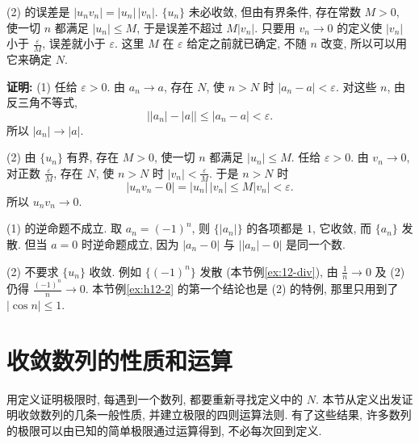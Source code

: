 \documentclass[UTF8,openany]{ctexbook}
\theoremstyle{chinesetextbook}
\newenvironment{cnproof}{\par\indent\textbf{证明:} \ignorespaces}{\par}
\begin{document}
(2) 的误差是 $|u_nv_n|=|u_n|\,|v_n|$. $\{u_n\}$ 未必收敛, 但由有界条件, 存在常数 $M>0$, 使一切 $n$ 都满足 $|u_n|\le M$, 于是误差不超过 $M|v_n|$. 只要用 $v_n\to0$ 的定义使 $|v_n|$ 小于 $\displaystyle\frac\varepsilon M$, 误差就小于 $\varepsilon$. 这里 $M$ 在 $\varepsilon$ 给定之前就已确定, 不随 $n$ 改变, 所以可以用它来确定 $N$.
\begin{cnproof}
(1) 任给 $\varepsilon>0$. 由 $a_n\to a$, 存在 $N$, 使 $n>N$ 时 $|a_n-a|<\varepsilon$. 对这些 $n$, 由反三角不等式,
\[
\bigl||a_n|-|a|\bigr|\le|a_n-a|<\varepsilon.
\]
所以 $|a_n|\to|a|$.

(2) 由 $\{u_n\}$ 有界, 存在 $M>0$, 使一切 $n$ 都满足 $|u_n|\le M$. 任给 $\varepsilon>0$. 由 $v_n\to0$, 对正数 $\displaystyle\frac\varepsilon M$, 存在 $N$, 使 $n>N$ 时 $\displaystyle|v_n|<\frac\varepsilon M$. 于是 $n>N$ 时
\[
|u_nv_n-0|=|u_n|\,|v_n|\le M|v_n|<\varepsilon.
\]
所以 $u_nv_n\to0$.
\end{cnproof}
(1) 的逆命题不成立. 取 $a_n=(-1)^n$, 则 $\{|a_n|\}$ 的各项都是 $1$, 它收敛, 而 $\{a_n\}$ 发散. 但当 $a=0$ 时逆命题成立, 因为 $|a_n-0|$ 与 $\bigl||a_n|-0\bigr|$ 是同一个数.

(2) 不要求 $\{u_n\}$ 收敛. 例如 $\{(-1)^n\}$ 发散 (本节例\ref{ex:12-div}), 由 $\displaystyle\frac1n\to0$ 及 (2) 仍得 $\displaystyle\frac{(-1)^n}n\to0$. 本节例\ref{ex:h12-2} 的第一个结论也是 (2) 的特例, 那里只用到了 $|\cos n|\le1$.
\section{收敛数列的性质和运算}
用定义证明极限时, 每遇到一个数列, 都要重新寻找定义中的 $N$. 本节从定义出发证明收敛数列的几条一般性质, 并建立极限的四则运算法则. 有了这些结果, 许多数列的极限可以由已知的简单极限通过运算得到, 不必每次回到定义.
\end{document}

